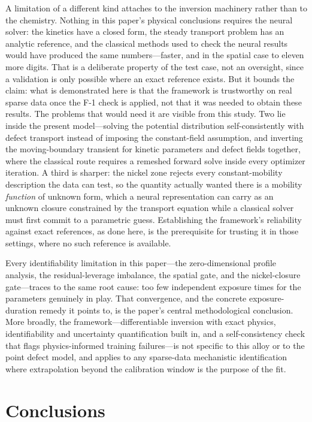 \documentclass[preprint,12pt]{elsarticle}
\begin{document}
A limitation of a different kind attaches to the inversion machinery
rather than to the chemistry. Nothing in this paper's physical
conclusions requires the neural solver: the kinetics have a closed form,
the steady transport problem has an analytic reference, and the classical
methods used to check the neural results would have produced the same
numbers---faster, and in the spatial case to eleven more digits. That is
a deliberate property of the test case, not an oversight, since a
validation is only possible where an exact reference exists. But it
bounds the claim: what is demonstrated here is that the framework is
trustworthy on real sparse data once the F-1 check is applied, not that
it was needed to obtain these results. The problems that would need it
are visible from this study. Two lie inside the present model---solving
the potential distribution self-consistently with defect transport
instead of imposing the constant-field assumption, and inverting the
moving-boundary transient for kinetic parameters and defect fields
together, where the classical route requires a remeshed forward solve
inside every optimizer iteration. A third is sharper: the nickel zone
rejects every constant-mobility description the data can test, so the
quantity actually wanted there is a mobility \emph{function} of unknown
form, which a neural representation can carry as an unknown closure
constrained by the transport equation while a classical solver must
first commit to a parametric guess. Establishing the framework's
reliability against exact references, as done here, is the prerequisite
for trusting it in those settings, where no such reference is available.

Every identifiability limitation in this paper---the zero-dimensional
profile analysis, the residual-leverage imbalance, the spatial gate, and
the nickel-closure gate---traces
to the same root cause: too few independent exposure times for the
parameters genuinely in play. That convergence, and the concrete
exposure-duration remedy it points to, is the paper's central
methodological conclusion. More broadly, the framework---differentiable
inversion with exact physics, identifiability and uncertainty
quantification built in, and a self-consistency check that flags
physics-informed training failures---is not specific to this alloy or
to the point defect model, and applies to any sparse-data mechanistic
identification where extrapolation beyond the calibration window is the
purpose of the fit.


\section{Conclusions}\label{sec:conclusions}
\end{document}
